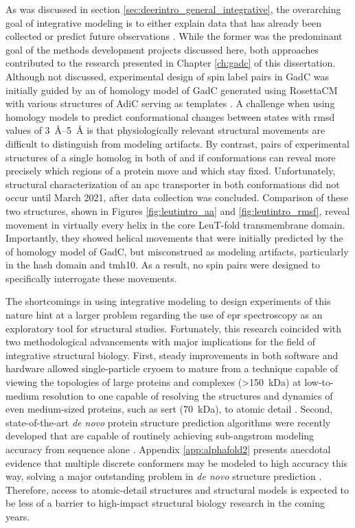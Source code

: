 As was discussed in section \ref{sec:deerintro_general_integrative}, the overarching goal of integrative modeling is to either explain data that has already been collected or predict future observations \citep*{Hofman2021}. While the former was the predominant goal of the methods development projects discussed here, both approaches contributed to the research presented in Chapter \ref{ch:gadc} of this dissertation. Although not discussed, experimental design of spin label pairs in GadC was initially guided by an \gls{of} homology model of GadC generated using RosettaCM \citep*{Song2013} with various structures of AdiC serving as templates \citep*{Fang2009, Gao2009}. A challenge when using homology models to predict conformational changes between states with \gls{rmsd} values of \SIrange{3}{5}{\angstrom} is that physiologically relevant structural movements are difficult to distinguish from modeling artifacts. By contrast, pairs of experimental structures of a single homolog in both \gls{of} and \gls{if} conformations can reveal more precisely which regions of a protein move and which stay fixed. Unfortunately, structural characterization of an \gls{apc} transporter in both conformations did not occur until March 2021, after data collection was concluded. Comparison of these two structures, shown in Figures \ref{fig:leutintro_aa} and \ref{fig:leutintro_rmsf}, reveal movement in virtually every helix in the core LeuT-fold transmembrane domain. Importantly, they showed helical movements that were initially predicted by the \gls{of} homology model of GadC, but misconstrued as modeling artifacts, particularly in the hash domain and \gls{tmh}10. As a result, no spin pairs were designed to specifically interrogate these movements.

The shortcomings in using integrative modeling to design experiments of this nature hint at a larger problem regarding the use of \gls{epr} spectroscopy as an exploratory tool for structural studies. Fortunately, this research coincided with two methodological advancements with major implications for the field of integrative structural biology. First, steady improvements in both software and hardware allowed single-particle \gls{cryoem} to mature from a technique capable of viewing the topologies of large proteins and complexes (>\SI{150}{kDa}) at low-to-medium resolution to one capable of resolving the structures and dynamics of even medium-sized proteins, such as \gls{sert} (\SI{70}{kDa}), to atomic detail \citep*{Coleman2019, Zhong2021}. Second, state-of-the-art \emph{de novo} protein structure prediction algorithms were recently developed that are capable of routinely achieving sub-angstrom modeling accuracy from sequence alone \citep*{Baek2021, Jumper2021}. Appendix \ref{app:alphafold2} presents anecdotal evidence that multiple discrete conformers may be modeled to high accuracy this way, solving a major outstanding problem in \emph{de novo} structure prediction \citep*{Nicoludis2018}. Therefore, access to atomic-detail structures and structural models is expected to be less of a barrier to high-impact structural biology research in the coming years.

